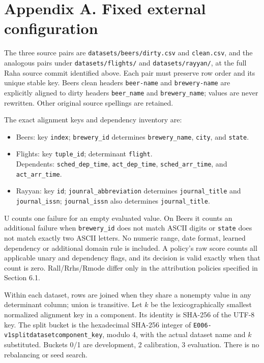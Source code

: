 \hypertarget{appendix-a.-fixed-external-configuration}{%
\section{Appendix A. Fixed external
configuration}\label{appendix-a.-fixed-external-configuration}}

The three source pairs are \texttt{datasets/beers/dirty.csv} and
\texttt{clean.csv}, and the analogous pairs under
\texttt{datasets/flights/} and \texttt{datasets/rayyan/}, at the full
Raha source commit identified above. Each pair must preserve row order
and its unique stable key. Beers clean headers \texttt{beer-name} and
\texttt{brewery-name} are explicitly aligned to dirty headers
\texttt{beer\_name} and \texttt{brewery\_name}; values are never
rewritten. Other original source spellings are retained.

The exact alignment keys and dependency inventory are:

\begin{itemize}
\tightlist
\item
  Beers: key \texttt{index}; \texttt{brewery\_id} determines
  \texttt{brewery\_name}, \texttt{city}, and \texttt{state}.
\item
  Flights: key \texttt{tuple\_id}; determinant \texttt{flight}.\\
  Dependents: \texttt{sched\_dep\_time}, \texttt{act\_dep\_time},
  \texttt{sched\_arr\_time}, and \texttt{act\_arr\_time}.
\item
  Rayyan: key \texttt{id}; \texttt{jounral\_abbreviation} determines
  \texttt{journal\_title} and \texttt{journal\_issn};
  \texttt{journal\_issn} also determines \texttt{journal\_title}.
\end{itemize}

U counts one failure for an empty evaluated value. On Beers it counts an
additional failure when \texttt{brewery\_id} does not match ASCII digits
or \texttt{state} does not match exactly two ASCII letters. No numeric
range, date format, learned dependency or additional domain rule is
included. A policy's raw score counts all applicable unary and
dependency flags, and its decision is valid exactly when that count is
zero. Rall/Rrhs/Rmode differ only in the attribution policies specified
in Section 6.1.

Within each dataset, rows are joined when they share a nonempty value in
any determinant column; union is transitive. Let \(k\) be the
lexicographically smallest normalized alignment key in a component. Its
identity is SHA-256 of the UTF-8 key. The split bucket is the
hexadecimal SHA-256 integer of
\texttt{E006-v1\textbar{}split\textbar{}dataset\textbar{}component\_key},
modulo 4, with the actual dataset name and \(k\) substituted. Buckets
0/1 are development, 2 calibration, 3 evaluation. There is no
rebalancing or seed search.

